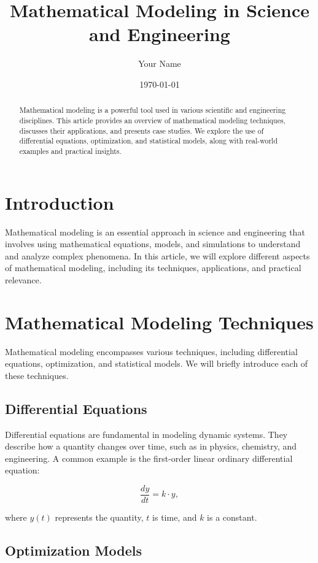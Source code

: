 \documentclass{article}
\title{Mathematical Modeling in Science and Engineering}
\author{Your Name}
\date{\today}
\begin{document}
\maketitle

\begin{abstract}
Mathematical modeling is a powerful tool used in various scientific and engineering disciplines. This article provides an overview of mathematical modeling techniques, discusses their applications, and presents case studies. We explore the use of differential equations, optimization, and statistical models, along with real-world examples and practical insights.
\end{abstract}

\section{Introduction}

Mathematical modeling is an essential approach in science and engineering that involves using mathematical equations, models, and simulations to understand and analyze complex phenomena. In this article, we will explore different aspects of mathematical modeling, including its techniques, applications, and practical relevance.

\section{Mathematical Modeling Techniques}

Mathematical modeling encompasses various techniques, including differential equations, optimization, and statistical models. We will briefly introduce each of these techniques.

\subsection{Differential Equations}

Differential equations are fundamental in modeling dynamic systems. They describe how a quantity changes over time, such as in physics, chemistry, and engineering. A common example is the first-order linear ordinary differential equation:

\begin{equation}
\frac{dy}{dt} = k \cdot y,
\end{equation}

where $y(t)$ represents the quantity, $t$ is time, and $k$ is a constant.

\subsection{Optimization Models}
\end{document}
